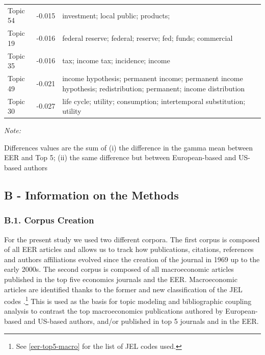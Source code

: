 \documentclass[]{elsarticle} %
\begin{document}
\begin{table}[!h]
\begin{threeparttable}
\begin{tabular}[t]{lrl}
\addlinespace
Topic 54 & -0.015 & investment; local public; products;
\cellcolor{gray!6}{local; property; public}\\
Topic 19 & -0.016 & federal reserve; federal; reserve; fed;
funds; commercial\\
Topic 35 & -0.016 & tax; income tax; incidence; income
\cellcolor{gray!6}{taxes; tax rate; corporate}\\
Topic 49 & -0.021 & income hypothesis; permanent
income; permanent income hypothesis;
redistribution; permanent; income
distribution\\
Topic 30 & -0.027 & life cycle; utility; consumption;
intertemporal substitution; utility
\cellcolor{gray!6}{function; life}\\
\bottomrule
\end{tabular}
\begin{tablenotes}
\item \textit{Note: } 
\item Differences values are the sum of (i) the difference in the gamma mean between EER and Top 5; (ii) the same difference but between European-based and US-based authors
\end{tablenotes}
\end{threeparttable}
\end{table}

\newpage

\hypertarget{appendix}{%
\subsection*{B - Information on the Methods}\label{appendix}}

\hypertarget{corpus}{%
\subsubsection*{B.1. Corpus Creation}\label{corpus}}

For the present study we used two different corpora. The first corpus is
composed of all EER articles and allows us to track how publications,
citations, references and authors affiliations evolved since the
creation of the journal in 1969 up to the early 2000s. The second corpus
is composed of all macroeconomic articles published in the top five
economics journals and the EER. Macroeconomic articles are identified
thanks to the former and new classification of the JEL codes
\citep{jel1991}.\footnote{See \ref{eer-top5-macro} for the list of JEL
  codes used.} This is used as the basis for topic modeling and
bibliographic coupling analysis to contrast the top macroeconomics
publications authored by European-based and US-based authors, and/or
published in top 5 journals and in the EER.
\end{document}

